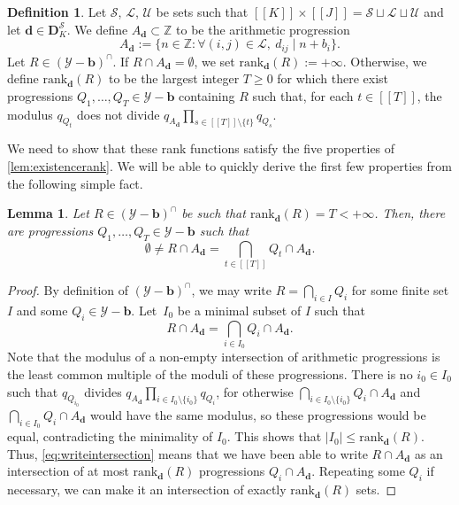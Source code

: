 \documentclass[11pt]{amsart}
\newtheorem{lemma}[theorem]{Lemma}
\theoremstyle{definition}
\newtheorem{definition}[theorem]{Definition}
\renewcommand{\leq}{\leqslant}
\renewcommand{\geq}{\geqslant}
\newcommand{\sinterval}[1]{[\![#1]\!] }
\newcommand{\abs}[1]{\left|#1\right|}
\newcommand{\Z}{\mathbb{Z}}
\newcommand{\rank}{\mathrm{rank}_{\d}}
\renewcommand{\d}{\boldsymbol{d}}
\newcommand{\pcomp}[2]{d_{#1#2}}
\newcommand{\sommespart}{b}
\newcommand{\progression}{A_{\d}}
\newcommand{\lit}{\mathcal{L}}
\newcommand{\unlit}{\mathcal{U}}
\newcommand{\s}{\mathcal{S}}
\newcommand{\fancyD}{\mathbf{D}}
\newcommand{\Ds}{\fancyD^{\s}_{\!\repK}}
\renewcommand{\vec}{\boldsymbol}
\newcommand{\prohibprog}{\mathcal{Y}}
\newcommand{\modulus}{q}
\newcommand{\repK}{K}
\newcommand{\newK}{\sinterval{K}}
\newcommand{\newR}{\sinterval{J}}
\newcommand{\shiftedprog}{\prohibprog-\vec{\sommespart}}
\newcommand{\interprog}{(\shiftedprog)^{\cap}}
\newcommand{\newerKR}{\newK\times\newR}
\newcommand{\ncond}{T}
\newcommand{\normalindxset}{I}
\begin{document}
\begin{definition}
\label{def:rank}
Let $\s$, $\lit$, $\unlit$ be sets such that $\newerKR = \s\sqcup\lit\sqcup\unlit$ and let $\d \in \Ds$. We define $\progression \subset \Z$ to be the arithmetic progression
\begin{equation*}
	\progression := \{n\in \Z : \forall (i,j)\in \lit, \ \pcomp{i}{j} \mid n+\sommespart_i\}.
\end{equation*}
Let $R \in \interprog$. If $R\cap \progression = \emptyset$, we set $\rank(R) := +\infty$. Otherwise, we define $\rank(R)$ to be the largest integer $\ncond \geq 0$ for which there exist progressions $Q_1, \ldots, Q_{\ncond}\in \shiftedprog$ containing $R$ such that, for each $t\in \sinterval{\ncond}$, the modulus $\modulus_{Q_t}$ does not divide $\modulus_{\progression}\prod_{s\in \sinterval{\ncond}\setminus \{t\}}\modulus_{Q_s}$.
\end{definition}

We need to show that these rank functions satisfy the five properties of \cref{lem:existencerank}. We will be able to quickly derive the first few properties from the following simple fact.

\begin{lemma}
\label{lem:rankintersection}
Let $R \in \interprog$ be such that $\rank(R) = \ncond < +\infty$. Then, there are progressions ${Q_1, \ldots, Q_{\ncond}\in \shiftedprog}$ such that
\begin{equation*}
	\emptyset \neq R \cap \progression = \bigcap_{t\in\sinterval{\ncond}} Q_t \cap \progression.
\end{equation*}
\end{lemma}
\begin{proof}
By definition of $\interprog$, we may write $R = \bigcap_{i\in \normalindxset} Q_i$ for some finite set $\normalindxset$ and some $Q_i\in \shiftedprog$. Let~$\normalindxset_0$ be a minimal subset of $\normalindxset$ such that 
\begin{equation}
\label{eq:writeintersection}
	R \cap \progression = \bigcap_{i\in \normalindxset_0} Q_i \cap \progression.
\end{equation}
Note that the modulus of a non-empty intersection of arithmetic progressions is the least common multiple of the moduli of these progressions.  
There is no $i_0\in \normalindxset_0$ such that $\modulus_{Q_{i_0}}$ divides $\modulus_{\progression}\prod_{i\in \normalindxset_0\setminus \{i_0\}}\modulus_{Q_i}$, for otherwise $\bigcap_{i\in \normalindxset_0\setminus \{i_0\}} Q_i \cap \progression$ and $\bigcap_{i\in \normalindxset_0} Q_i \cap \progression$ would have the same modulus, so these progressions would be equal, contradicting the minimality of $\normalindxset_0$. This shows that $\abs{\normalindxset_0} \leq \rank(R)$. Thus, \cref{eq:writeintersection} means that we have been able to write $R \cap \progression$ as an intersection of at most $\rank(R)$ progressions $Q_i \cap \progression$. Repeating some $Q_i$ if necessary, we can make it an intersection of exactly $\rank(R)$ sets.
\end{proof}
\end{document}
